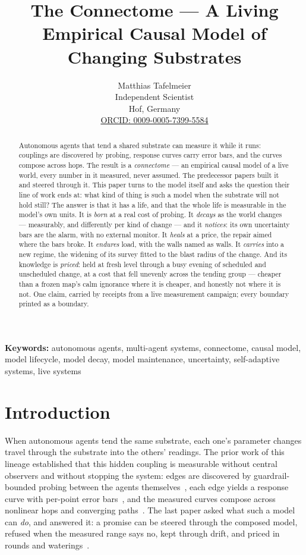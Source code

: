 \documentclass[11pt,a4paper]{article}
\title{The Connectome --- A Living Empirical Causal Model of\\ Changing Substrates}
\author{
  Matthias Tafelmeier \\
  Independent Scientist \\
  Hof, Germany \\
  \href{https://orcid.org/0009-0005-7399-5584}{ORCID: 0009-0005-7399-5584}
}
\date{}
\begin{document}
\maketitle

\begin{abstract}
Autonomous agents that tend a shared substrate can measure it while it
runs: couplings are discovered by probing, response curves carry error
bars, and the curves compose across hops. The result is a
\emph{connectome} --- an empirical causal model of a live world, every
number in it measured, never assumed. The predecessor papers built it
and steered through it. This paper turns to the model itself and asks
the question their line of work ends at: what kind of thing is such a
model when the substrate will not hold still? The answer is that it has
a life, and that the whole life is measurable in the model's own units.
It is \emph{born} at a real cost of probing. It \emph{decays} as the
world changes --- measurably, and differently per kind of change --- and
it \emph{notices}: its own uncertainty bars are the alarm, with no
external monitor. It \emph{heals} at a price, the repair aimed where
the bars broke. It \emph{endures} load, with the walls named as walls.
It \emph{carries} into a new regime, the widening of its survey fitted
to the blast radius of the change. And its knowledge is \emph{priced}:
held at fresh level through a busy evening of scheduled and unscheduled
change, at a cost that fell unevenly across the tending group ---
cheaper than a frozen map's calm ignorance where it is cheaper, and
honestly not where it is not. One claim, carried by receipts from a
live measurement campaign; every boundary printed as a boundary.
\end{abstract}

\noindent\textbf{Keywords:} autonomous agents, multi-agent systems,
connectome, causal model, model lifecycle, model decay, model
maintenance, uncertainty, self-adaptive systems, live systems

\section{Introduction}
\label{sec:intro}

When autonomous agents tend the same substrate, each one's parameter
changes travel through the substrate into the others' readings. The
prior work of this lineage established that this hidden coupling is
measurable without central observers and without stopping the system:
edges are discovered by guardrail-bounded probing between the agents
themselves~\cite{p1}, each edge yields a response curve with per-point
error bars~\cite{p2}, and the measured curves compose across nonlinear
hops and converging paths~\cite{p3}. The last paper asked what such a
model can \emph{do}, and answered it: a promise can be steered through
the composed model, refused when the measured range says no, kept
through drift, and priced in rounds and waterings~\cite{p4}.
\end{document}
